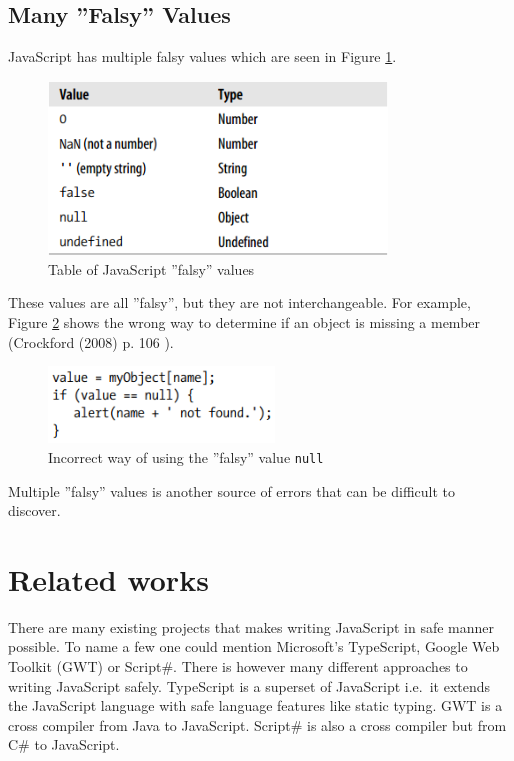 	\subsection{Many ''Falsy'' Values} %
	\label{sub:many_falsy_values}
		JavaScript has multiple falsy values which are seen in Figure \ref{falsyValues}.

			\begin{figure}[H]
				\begin{center}
					\centerline{\includegraphics[width=9cm]{resources/images/FalsyValues.png}}
				\end{center}
				\caption{Table of JavaScript ''falsy'' values \cite{good_parts}}
				\label{falsyValues}
			\end{figure}

		These values are all ''falsy'', but they are not interchangeable. For example, Figure \ref{falsyExample} shows the wrong way to determine if an object is missing a member (Crockford (2008) p. 106 \cite{good_parts}).

					\begin{figure}[H]
				\begin{center}
					\centerline{\includegraphics[width=6cm]{resources/images/FalsyExample.png}}
				\end{center}
				\caption{Incorrect way of using the ''falsy'' value \texttt{null} \cite{good_parts}}
				\label{falsyExample}
			\end{figure}

		Multiple ''falsy'' values is another source of errors that can be difficult to discover.

\section{Related works} %
\label{sec:related_works}
	There are many existing projects that makes writing JavaScript in safe manner possible. To name a few one could mention Microsoft’s TypeScript, Google Web Toolkit (GWT) or Script\#. There is however many different approaches to writing JavaScript safely. TypeScript is a superset of JavaScript i.e.\ it extends the JavaScript language with safe language features like static typing. GWT is a cross compiler from Java to JavaScript. Script\# is also a cross compiler but from C\# to JavaScript.

